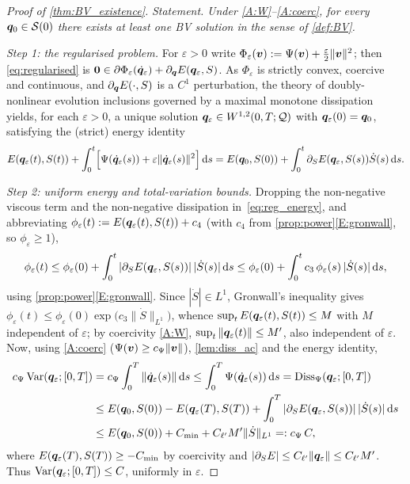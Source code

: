 \begin{proof}[Proof of \cref{thm:BV_existence}]
\emph{Statement.} \emph{Under \ref{A:W}--\ref{A:coerc}, for every
$\bm{q}_0\in\mathcal S(0)$ there exists at least one BV solution in the
sense of \cref{def:BV}.}

\smallskip
\emph{Step 1: the regularised problem.} For $\varepsilon>0$ write
$\Phi_\varepsilon(\bm{v}):=\Psi(\bm{v})+\tfrac{\varepsilon}{2}\|\bm{v}\|^2$;
then \eqref{eq:regularised} is $\bm{0}\in\partial\Phi_\varepsilon(\dot{\bm{q}}_\varepsilon)+\partial_{\bm{q}}E(\bm{q}_\varepsilon,S)$.
As $\Phi_\varepsilon$ is strictly convex, coercive and continuous, and
$\partial_{\bm{q}}E(\cdot,S)$ is a $C^1$ perturbation, the theory of
doubly-nonlinear evolution inclusions governed by a maximal monotone
dissipation \cite{Brezis1973} yields, for each $\varepsilon>0$, a unique
solution $\bm{q}_\varepsilon\in W^{1,2}(0,T;\mathcal{Q})$ with
$\bm{q}_\varepsilon(0)=\bm{q}_0$, satisfying the (strict) energy identity
\begin{equation}\label{eq:reg_energy}
  E(\bm{q}_\varepsilon(t),S(t))+\int_0^t\Bigl[\Psi(\dot{\bm{q}}_\varepsilon(s))+\varepsilon\|\dot{\bm{q}}_\varepsilon(s)\|^2\Bigr]\mathop{}\!\mathrm{d} s
  =E(\bm{q}_0,S(0))+\int_0^t\partial_S E(\bm{q}_\varepsilon,S(s))\dot S(s)\mathop{}\!\mathrm{d} s .
\end{equation}

\emph{Step 2: uniform energy and total-variation bounds.} Dropping the
non-negative viscous term and the non-negative dissipation
in~\eqref{eq:reg_energy}, and abbreviating
$\phi_\varepsilon(t):=E(\bm{q}_\varepsilon(t),S(t))+c_4$ (with $c_4$ from
\cref{prop:power}\ref{E:gronwall}, so $\phi_\varepsilon\ge1$),
\[
  \phi_\varepsilon(t)\le\phi_\varepsilon(0)+\int_0^t|\partial_S E(\bm{q}_\varepsilon,S(s))|\,|\dot S(s)|\mathop{}\!\mathrm{d} s
  \le\phi_\varepsilon(0)+\int_0^t c_3\,\phi_\varepsilon(s)\,|\dot S(s)|\mathop{}\!\mathrm{d} s,
\]
using \cref{prop:power}\ref{E:gronwall}. Since $|\dot S|\in L^1$,
Gronwall's inequality gives
$\phi_\varepsilon(t)\le\phi_\varepsilon(0)\exp\!\bigl(c_3\|\dot S\|_{L^1}\bigr)$,
whence $\sup_t E(\bm{q}_\varepsilon(t),S(t))\le M$ with $M$ independent of
$\varepsilon$; by coercivity \ref{A:W}, $\sup_t\|\bm{q}_\varepsilon(t)\|\le M'$,
also independent of $\varepsilon$. Now, using \ref{A:coerc}
($\Psi(\bm{v})\ge c_\Psi\|\bm{v}\|$), \cref{lem:diss_ac} and the energy
identity,
\begin{align}
  c_\Psi\,\mathrm{Var}(\bm{q}_\varepsilon;[0,T])
  &=c_\Psi\int_0^T\|\dot{\bm{q}}_\varepsilon(s)\|\mathop{}\!\mathrm{d} s
  \le\int_0^T\Psi(\dot{\bm{q}}_\varepsilon(s))\mathop{}\!\mathrm{d} s
  =\mathrm{Diss}_\Psi(\bm{q}_\varepsilon;[0,T]) \notag\\
  &\le E(\bm{q}_0,S(0))-E(\bm{q}_\varepsilon(T),S(T))
  +\int_0^T|\partial_S E(\bm{q}_\varepsilon,S(s))|\,|\dot S(s)|\mathop{}\!\mathrm{d} s \notag\\
  &\le E(\bm{q}_0,S(0))+C_{\min}+C_{\ell'}M'\|\dot S\|_{L^1}
  =:c_\Psi\,C, \label{eq:var_bound_bv}
\end{align}
where $E(\bm{q}_\varepsilon(T),S(T))\ge-C_{\min}$ by coercivity and
$|\partial_S E|\le C_{\ell'}\|\bm{q}_\varepsilon\|\le C_{\ell'}M'$. Thus
$\mathrm{Var}(\bm{q}_\varepsilon;[0,T])\le C$, uniformly in $\varepsilon$.


\end{proof}
